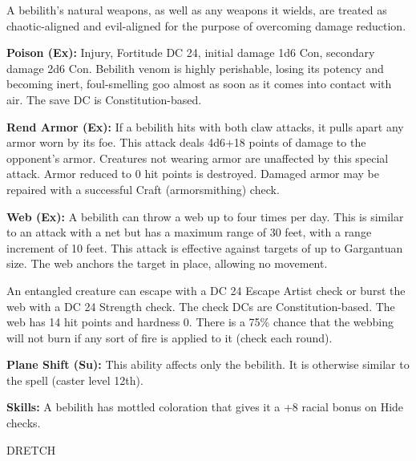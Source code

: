 \documentclass{article}
\begin{document}
A bebilith's natural weapons, as well as any weapons it wields, are treated as 
chaotic-aligned and evil-aligned for the purpose of overcoming damage reduction.

\textbf{Poison (Ex):} Injury, Fortitude DC 24, initial damage 1d6 Con, secondary 
damage 2d6 Con. Bebilith venom is highly perishable, losing its potency and becoming 
inert, foul-smelling goo almost as soon as it comes into contact with air. The 
save DC is Constitution-based.

\textbf{Rend Armor (Ex): }If a bebilith hits with both claw attacks, it pulls apart 
any armor worn by its foe. This attack deals 4d6+18 points of damage to the opponent's 
armor. Creatures not wearing armor are unaffected by this special attack. Armor 
reduced to 0 hit points is destroyed. Damaged armor may be repaired with a successful 
Craft (armorsmithing) check.

\textbf{Web (Ex): }A bebilith can throw a web up to four times per day. This is 
similar to an attack with a net but has a maximum range of 30 feet, with a range 
increment of 10 feet. This attack is effective against targets of up to Gargantuan 
size. The web anchors the target in place, allowing no movement.

An entangled creature can escape with a DC 24 Escape Artist check or burst the 
web with a DC 24 Strength check. The check DCs are Constitution-based. The web 
has 14 hit points and hardness 0. There is a 75\% chance that the webbing will 
not burn if any sort of fire is applied to it (check each round).

\textbf{Plane Shift (Su):} This ability affects only the bebilith. It is otherwise 
similar to the spell (caster level 12th).

\textbf{Skills:} A bebilith has mottled coloration that gives it a +8 racial bonus 
on Hide checks.

\vspace{12pt}
DRETCH
\end{document}
